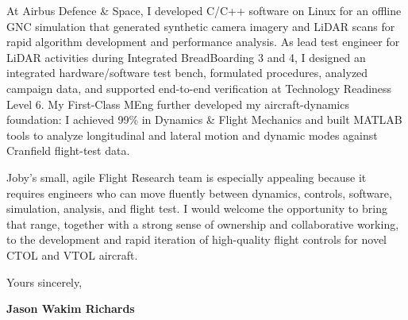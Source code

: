 \documentclass[10pt,a4paper]{article}
\newcommand{\BodySize}{9.25pt}
\newcommand{\BodyLineSize}{12.1pt}
\newcommand{\ParagraphSpacing}{10pt}       %
\newcommand{\ClosingBefore}{7pt}          %
\newcommand{\SignatureSpace}{22pt}         %
\newcommand{\LetterParagraph}[1]{%
    \noindent #1\par
    \addvspace{\ParagraphSpacing}%
}
\newcommand{\LetterFinalParagraph}[1]{%
    \noindent #1\par
}
\begin{document}
{    \LetterParagraph{%
        At Airbus Defence \& Space, I developed C/C++ software on Linux for an offline
        GNC simulation that generated synthetic camera imagery and LiDAR scans for rapid
        algorithm development and performance analysis. As lead test engineer for LiDAR
        activities during Integrated BreadBoarding 3 and 4, I designed an integrated
        hardware/software test bench, formulated procedures, analyzed campaign data, and
        supported end-to-end verification at Technology Readiness Level 6. My First-Class
        MEng further developed my aircraft-dynamics foundation: I achieved 99\% in
        Dynamics \& Flight Mechanics and built MATLAB tools to analyze longitudinal and
        lateral motion and dynamic modes against Cranfield flight-test data.%
    }

    \LetterFinalParagraph{%
        Joby's small, agile Flight Research team is especially appealing because it
        requires engineers who can move fluently between dynamics, controls, software,
        simulation, analysis, and flight test. I would welcome the opportunity to bring
        that range, together with a strong sense of ownership and collaborative working,
        to the development and rapid iteration of high-quality flight controls for novel
        CTOL and VTOL aircraft.%
    }
}


\vspace{\ClosingBefore}

{\fontsize{\BodySize}{\BodyLineSize}\selectfont
    \textcolor{CVDarkGray}{Yours sincerely,}}

\vspace{\SignatureSpace}

{\fontsize{\BodySize}{\BodyLineSize}\selectfont
    \textbf{\textcolor{CVBlack}{Jason Wakim Richards}}}
\end{document}
